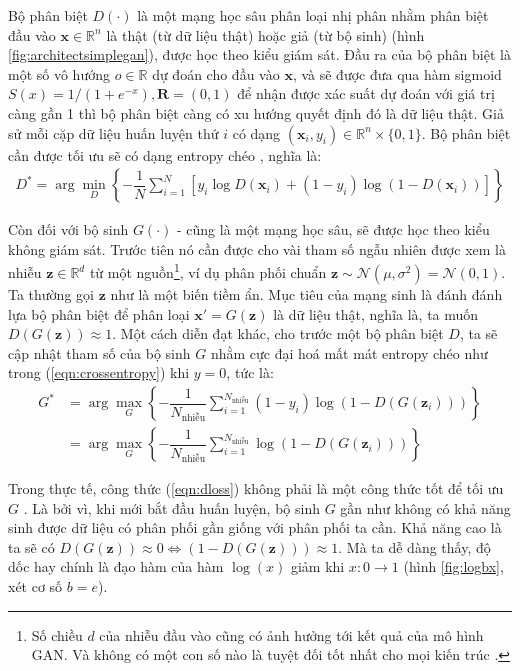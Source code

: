 \documentclass[a4paper, 12pt]{report}
\begin{document}
Bộ phân biệt $D\left(\cdot\right)$ là một mạng học sâu phân loại nhị phân nhằm phân biệt đầu vào $\mathbf{x} \in \mathbb{R}^n$ là thật (từ dữ liệu thật) hoặc giả (từ bộ sinh) (hình \ref{fig:architectsimplegan}), được học theo kiểu giám sát.
Đầu ra của bộ phân biệt là một số vô hướng $o \in \mathbb{R}$ dự đoán cho đầu vào $\mathbf{x}$, và sẽ được đưa qua hàm sigmoid $S(x) = 1/(1 + e^{-x}), \bm{R} = (0, 1)$ để nhận được xác suất dự đoán với giá trị càng gần 1 thì bộ phân biệt càng có xu hướng quyết định đó là dữ liệu thật.
Giả sử mỗi cặp dữ liệu huấn luyện thứ $i$ có dạng $\left(\mathbf{x}_i, y_i\right) \in \mathbb{R}^n\times\{0, 1\}$.
Bộ phân biệt cần được tối ưu sẽ có dạng entropy chéo \cite{wikicrossentropy2021}, nghĩa là:
\begin{align}
    D^*=\arg\min_{D}\left\{-\dfrac{1}{N}\sum_{i=1}^{N}\left[y_i\log D\left(\mathbf{x}_i\right) + \left(1-y_i\right)\log\left(1-D\left(\mathbf{x}_i\right)\right)\right]\right\}\label{eqn:crossentropy}
\end{align}

Còn đối với bộ sinh $G\left(\cdot\right)$ - cũng là một mạng học sâu, sẽ được học theo kiểu không giám sát.
Trước tiên nó cần được cho vài tham số ngẫu nhiên được xem là nhiễu $\mathbf{z} \in \mathbb{R}^d$ từ một nguồn\footnote{Số chiều $d$ của nhiễu đầu vào cũng có ảnh hưởng tới kết quả của mô hình GAN.
Và không có một con số nào là tuyệt đối tốt nhất cho mọi kiến trúc \cite{padala2020effect}.}, ví dụ phân phối chuẩn $\mathbf{z} \sim \mathcal{N}\left(\mu, \sigma^2\right)=\mathcal{N}\left(0, 1\right)$.
Ta thường gọi $\mathbf{z}$ như là một biến tiềm ẩn.
Mục tiêu của mạng sinh là đánh đánh lựa bộ phân biệt để phân loại $\mathbf{x'} = G\left(\mathbf{z}\right)$ là dữ liệu thật, nghĩa là, ta muốn $D\left(G\left(\mathbf{z}\right)\right) \approx 1$.
Một cách diễn đạt khác, cho trước một bộ phân biệt $D$, ta sẽ cập nhật tham số của bộ sinh $G$ nhằm cực đại hoá mất mát entropy chéo như trong (\ref{eqn:crossentropy}) khi $y=0$, tức là:
\begin{align}
    G^*&=\arg\max_G\left\{-\dfrac{1}{N_{\text{nhiễu}}}\sum_{i=1}^{N_{\text{nhiễu}}}\left(1-y_i\right)\log\left(1-D\left(G\left(\mathbf{z}_i\right)\right)\right)\right\}\nonumber\\
    &=\arg\max_G\left\{-\dfrac{1}{N_{\text{nhiễu}}}\sum_{i=1}^{N_{\text{nhiễu}}}\log\left(1-D\left(G\left(\mathbf{z}_i\right)\right)\right)\right\}\label{eqn:dloss}
\end{align}

Trong thực tế, công thức (\ref{eqn:dloss}) không phải là một công thức tốt để tối ưu $G$ \cite{optimizegan2017}.
Là bởi vì, khi mới bắt đầu huấn luyện, bộ sinh $G$ gần như không có khả năng sinh được dữ liệu có phân phối gần giống với phân phối ta cần.
Khả năng cao là ta sẽ có $D\left(G\left(\mathbf{z}\right)\right) \approx 0 \Leftrightarrow \left(1-D\left(G\left(\mathbf{z}\right)\right)\right) \approx 1$.
Mà ta dễ dàng thấy, độ dốc hay chính là đạo hàm của hàm $\log(x)$ giảm khi $x:0\rightarrow 1$ (hình \ref{fig:logbx}, xét cơ số $b = e$).
\end{document}
